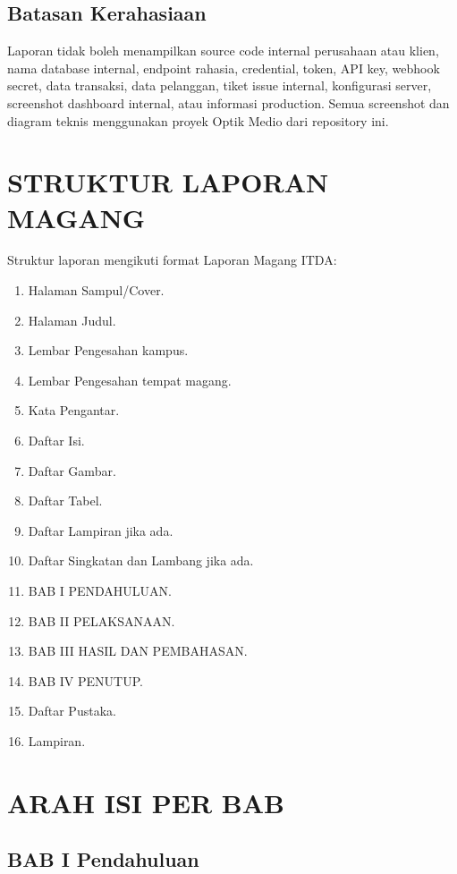 \documentclass[12pt,a4paper]{report}
\begin{document}
\section{Batasan Kerahasiaan}

Laporan tidak boleh menampilkan source code internal perusahaan atau klien, nama database internal, endpoint rahasia, credential, token, API key, webhook secret, data transaksi, data pelanggan, tiket issue internal, konfigurasi server, screenshot dashboard internal, atau informasi production. Semua screenshot dan diagram teknis menggunakan proyek Optik Medio dari repository ini.

\chapter{STRUKTUR LAPORAN MAGANG}

Struktur laporan mengikuti format Laporan Magang ITDA:

\begin{enumerate}
    \item Halaman Sampul/Cover.
    \item Halaman Judul.
    \item Lembar Pengesahan kampus.
    \item Lembar Pengesahan tempat magang.
    \item Kata Pengantar.
    \item Daftar Isi.
    \item Daftar Gambar.
    \item Daftar Tabel.
    \item Daftar Lampiran jika ada.
    \item Daftar Singkatan dan Lambang jika ada.
    \item BAB I PENDAHULUAN.
    \item BAB II PELAKSANAAN.
    \item BAB III HASIL DAN PEMBAHASAN.
    \item BAB IV PENUTUP.
    \item Daftar Pustaka.
    \item Lampiran.
\end{enumerate}

\chapter{ARAH ISI PER BAB}

\section{BAB I Pendahuluan}
\end{document}
